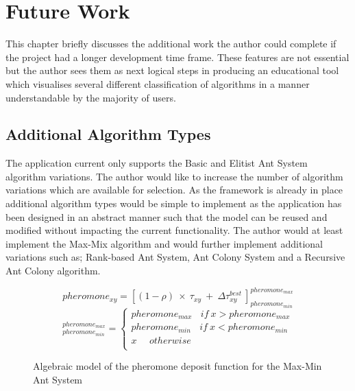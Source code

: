 \chapter{Future Work}
\label{footure}
This chapter briefly discusses the additional work the author could complete if the project had a longer development time frame. These features are not essential but the author sees them as next logical steps in producing an educational tool which visualises several different classification of algorithms in a manner understandable by the majority of users.

\section{Additional Algorithm Types}

The application current only supports the Basic and Elitist Ant System algorithm variations. The author would like to increase the number of algorithm variations which are available for selection. As the framework is already in place additional algorithm types would be simple to implement as the application has been designed in an abstract manner such that the model can be reused and modified without impacting the current functionality. The author would at least implement the Max-Mix algorithm and would further implement additional variations such as; Rank-based Ant System, Ant Colony System and a Recursive Ant Colony algorithm. 

\begin{figure}[H]
\Large
\begin{equation}
pheromone_{xy} = [(1 - \rho)\ \times\ \tau_{xy}\ +\ \Delta\tau_{xy}^{best}\ ]_{pheromone_{min}}^{pheromone_{max}}
\end{equation}
\begin{equation}
[x]_{pheromone_{min}}^{pheromone_{max}} = \left\{\begin{matrix}
pheromone_{max}\ \ \ \ if\ x > pheromone_{max} \\ 
pheromone_{min}\ \ \ \ if\ x < pheromone_{min} \\ 
x \ \ \ \ \ \ otherwise\\ 
\end{matrix}\right.
\end{equation}

\caption[Max-Mix Pheromone Function]{Algebraic model of the pheromone deposit function for the Max-Min Ant System \cite{AntColontSite:slides}}
\label{MaxMinSystemPhero}

\end{figure}

